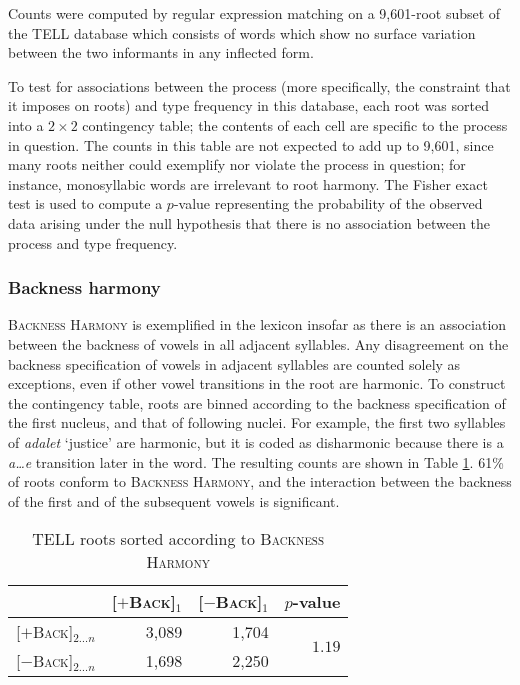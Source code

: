 Counts were computed by regular expression matching on a 9,601-root subset of the TELL database which consists of words which show no surface variation between the two informants in any inflected form.

To test for associations between the process (more specifically, the constraint that it imposes on roots) and type frequency in this database, each root was sorted into a $2 \times 2$ contingency table; the contents of each cell are specific to the process in question. The counts in this table are not expected to add up to 9,601, since many roots neither could exemplify nor violate the process in question; for instance, monosyllabic words are irrelevant to root harmony. The Fisher exact test is used to compute a $p$-value representing the probability of the observed data arising under the null hypothesis that there is no association between the process and type frequency.

\subsubsection{Backness harmony}

\textsc{Backness Harmony} is exemplified in the lexicon insofar as there is an association between the backness of vowels in all adjacent syllables. Any disagreement on the backness specification of vowels in adjacent syllables are counted solely as exceptions, even if other vowel transitions in the root are harmonic. 
To construct the contingency table, roots are binned according to the backness specification of the first nucleus, and that of following nuclei. For example, the first two syllables of \emph{adalet} `justice' are harmonic, but it is coded as disharmonic because there is a \emph{a\ldots{}e} transition later in the word. The resulting counts are shown in Table \ref{bhs}. 61\% of roots conform to \textsc{Backness Harmony}, and the interaction between the backness of the first and of the subsequent vowels
is significant.

\begin{table}[ht]
\centering
\begin{tabular}{lrrr}
\toprule
                             & [$+$\textsc{Back}]$_1$ & [$-$\textsc{Back}]$_1$ & $p$-value                     \\
\midrule
\buf{}[$+$\textsc{Back}]$_{2\ldots{}n}$ & 3,089                     & 1,704              & \multirow{2}{*}{$1.19$\e{-89}} \\
\buf{}[$-$\textsc{Back}]$_{2\ldots{}n}$ & 1,698                     & 2,250                                               \\
\bottomrule
\end{tabular}
\caption{TELL roots sorted according to \textsc{Backness Harmony}}
\label{bhs}
\end{table}

